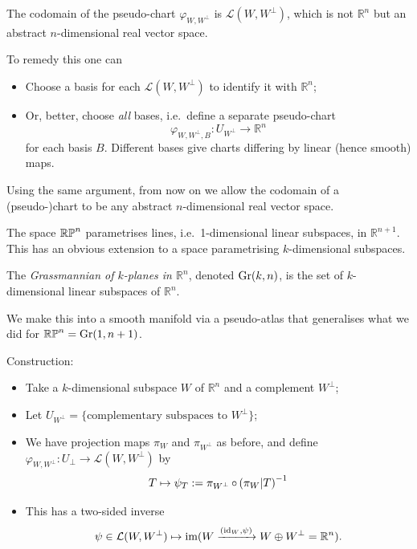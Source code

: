 \documentclass[a4paper,11pt]{article}
\begin{document}
	\begin{rmk}
		The codomain of the pseudo-chart $\varphi_{W,W^\perp}$ is $\mathcal{L}(W,W^\perp)$, which is not $\mathbb{R}^n$ but an abstract $n$-dimensional real vector space.

		To remedy this one can
		\begin{itemize}
			\item Choose a basis for each $\mathcal{L}(W,W^\perp)$ to identify it with $\mathbb{R}^n$;
			\item Or, better, choose \emph{all} bases, i.e.\ define a separate pseudo-chart \[
				\varphi_{W,W^\perp,B}: U_{W^\perp} \to \mathbb{R}^n
			\]
			for each basis $B$. Different bases give charts differing by linear (hence smooth) maps.
		\end{itemize}

		Using the same argument, from now on we allow the codomain of a (pseudo-)chart to be any abstract $n$-dimensional real vector space.
	\end{rmk}

	The space $\mathbb{RP}^{n}$ parametrises lines, i.e.\ 1-dimensional linear subspaces, in $\mathbb{R}^{n+1}$. This has an obvious extension to a space parametrising $k$-dimensional subspaces.

	\begin{defi}
		The \emph{Grassmannian of $k$-planes in $\mathbb{R}^n$}, denoted $\mathrm{Gr}({k},{n})$, is the set of $k$-dimensional linear subspaces of $\mathbb{R}^n$. 
	\end{defi}

	We make this into a smooth manifold via a pseudo-atlas that generalises what we did for $\mathbb{RP}^{n} = \mathrm{Gr}({1},{n+1})$.

	Construction:
	\begin{itemize}
		\item Take a $k$-dimensional subspace $W$ of $\mathbb{R}^n$ and a complement $W^\perp$;
		\item Let $U_{W^\perp} = \{\text{complementary subspaces to }W^\perp\}$;
		\item We have projection maps $\pi_W$ and $\pi_{W^\perp}$ as before, and define $\varphi_{W,W^\perp}: U_\perp \to \mathcal{L}(W,W^\perp)$ by \[
			T \mapsto \psi_T := \pi_{W^\perp} \operatorname{\circ} \left( \pi_W | T \right)^{-1}
		\]
		\item This has a two-sided inverse \[
			\psi \in \mathcal{L}(W, W^\perp) \mapsto \text{im}(W \xrightarrow{(\operatorname{id}_W, \psi)} W \oplus W^\perp = \mathbb{R}^n).
		\]
	\end{itemize}
\end{document}
